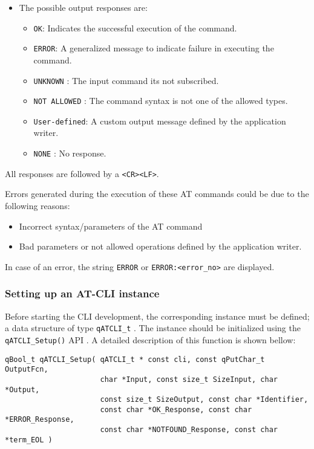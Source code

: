 \begin{itemize}
    \item The possible output responses are:
    \begin{itemize}
        \item \lstinline{OK}: Indicates the successful execution of the command.
        \item \lstinline{ERROR}: A generalized message to indicate failure in executing the command. 
        \item \lstinline{UNKNOWN} : The input command its not subscribed.
        \item \lstinline{NOT ALLOWED} : The command syntax is not one of the allowed types.
        \item \lstinline{User-defined}: A custom output message defined by the application writer.
        \item \lstinline{NONE} : No response.
    \end{itemize}
\end{itemize}

All responses are followed by a \lstinline{<CR><LF>}.
\medskip

Errors generated during the execution of these AT commands could be due to the following reasons:
\begin{itemize}
    \item Incorrect syntax/parameters of the AT command
    \item Bad parameters or not allowed operations defined by the application writer.
\end{itemize}

In case of an error, the string \lstinline{ERROR} or \lstinline{ERROR:<error_no>} are displayed.

\subsubsection{Setting up an AT-CLI instance}
Before starting the CLI development, the corresponding instance must be defined; a data structure of type \lstinline{qATCLI_t} . 
The instance should be initialized using the \lstinline{qATCLI_Setup()} API . A detailed description of this function is shown bellow:
\medskip

\begin{lstlisting}[style=CStyle]
qBool_t qATCLI_Setup( qATCLI_t * const cli, const qPutChar_t OutputFcn, 
                      char *Input, const size_t SizeInput, char *Output, 
                      const size_t SizeOutput, const char *Identifier, 
                      const char *OK_Response, const char *ERROR_Response, 
                      const char *NOTFOUND_Response, const char *term_EOL )
\end{lstlisting}

